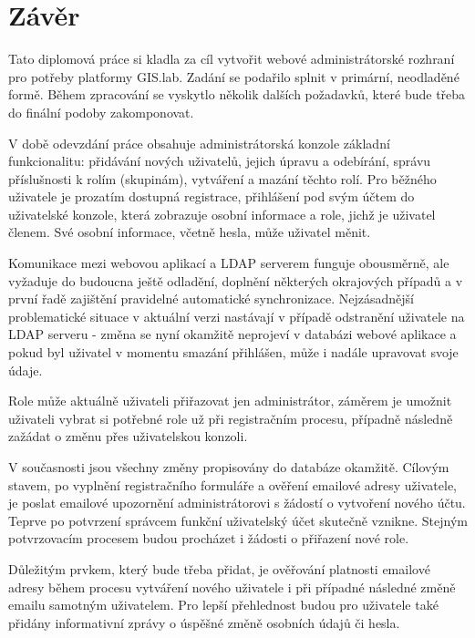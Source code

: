 \chapter*{Závěr}
\label{5-zaver}


Tato diplomová práce si kladla za cíl vytvořit webové administrátorské
rozhraní pro potřeby platformy GIS.lab. Zadání se podařilo splnit v
primární, neodladěné formě. Během zpracování se vyskytlo několik
dalších požadavků, které bude třeba do finální podoby zakomponovat.

V době odevzdání práce obsahuje administrátorská konzole základní
funkcionalitu: přidávání nových uživatelů, jejich úpravu a odebírání,
správu příslušnosti k rolím (skupinám), vytváření a mazání těchto
rolí. Pro běžného uživatele je prozatím dostupná registrace,
přihlášení pod svým účtem do uživatelské konzole, která zobrazuje
osobní informace a role, jichž je uživatel členem. Své osobní
informace, včetně hesla, může uživatel měnit.

Komunikace mezi webovou aplikací a LDAP serverem funguje obousměrně,
ale vyžaduje do budoucna ještě odladění, doplnění některých okrajových
případů a v první řadě zajištění pravidelné automatické
synchronizace. Nejzásadnější problematické situace v aktuální verzi
nastávají v případě odstranění uživatele na LDAP serveru - změna se
nyní okamžitě neprojeví v databázi webové aplikace a pokud byl
uživatel v momentu smazání přihlášen, může i nadále upravovat svoje
údaje.

Role může aktuálně uživateli přiřazovat jen administrátor, záměrem je
umožnit uživateli vybrat si potřebné role už při registračním procesu,
případně následně zažádat o změnu přes uživatelskou konzoli.

V současnosti jsou všechny změny propisovány do databáze
okamžitě. Cílovým stavem, po vyplnění registračního formuláře a
ověření emailové adresy uživatele, je poslat emailové upozornění
administrátorovi s žádostí o vytvoření nového účtu. Teprve po
potvrzení správcem funkční uživatelský účet skutečně vznikne. Stejným
potvrzovacím procesem budou procházet i žádosti o přiřazení nové role.

Důležitým prvkem, který bude třeba přidat, je ověřování platnosti
emailové adresy během procesu vytváření nového uživatele i při
případné následné změně emailu samotným uživatelem. Pro lepší
přehlednost budou pro uživatele také přidány informativní zprávy o
úspěšné změně osobních údajů či hesla.

